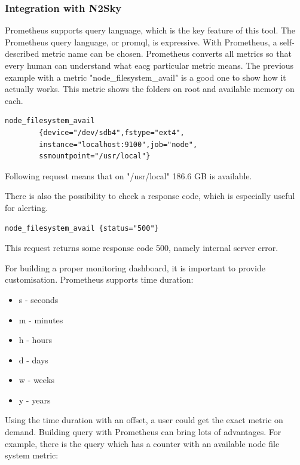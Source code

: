 \subsubsection{Integration with N2Sky}\label{Integration with N2Sky}

Prometheus supports query language, which is the key feature of this tool. The Prometheus query language, or promql, is expressive. 
With Prometheus, a self-described metric name can be chosen. Prometheus converts all metrics so that every human can understand what eacg particular metric means. The previous example with a metric "node\_filesystem\_avail" is a good one to show how it actually works. This metric shows the folders on root and available memory on each.

\begin{lstlisting}[caption=Prometheus query]
    node_filesystem_avail 
        {device="/dev/sdb4",fstype="ext4",
        instance="localhost:9100",job="node",
        ssmountpoint="/usr/local"}
\end{lstlisting}

Following request means that on "/usr/local" 186.6 GB is available. 

There is also the possibility to check a response code, which is especially useful for alerting. 

\begin{lstlisting}[caption=Prometheus short query]
        node_filesystem_avail {status="500"}
\end{lstlisting}

This request returns some response code 500, namely internal server error. 

For building a proper monitoring dashboard, it is important to provide customisation. Prometheus supports time duration:

\begin{itemize}
\item s - seconds
\item m - minutes
\item h - hours
\item d - days
\item w - weeks
\item y - years
\end{itemize}

Using the time duration with an offset, a user could get the exact metric on demand. 
Building query with Prometheus can bring lots of advantages. For example, there is the query which has a counter with an available node file system metric:

